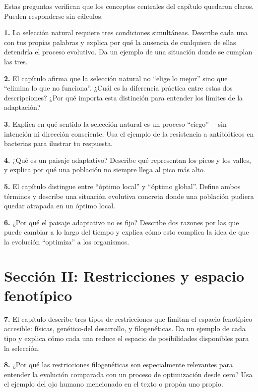 \documentclass[
  letterpaper,
  DIV=11,
  numbers=noendperiod]{scrreprt}
\begin{document}
Estas preguntas verifican que los conceptos centrales del capítulo
quedaron claros. Pueden responderse sin cálculos.

\textbf{1.} La selección natural requiere tres condiciones simultáneas.
Describe cada una con tus propias palabras y explica por qué la ausencia
de cualquiera de ellas detendría el proceso evolutivo. Da un ejemplo de
una situación donde se cumplan las tres.

\textbf{2.} El capítulo afirma que la selección natural no ``elige lo
mejor'' sino que ``elimina lo que no funciona''. ¿Cuál es la diferencia
práctica entre estas dos descripciones? ¿Por qué importa esta distinción
para entender los límites de la adaptación?

\textbf{3.} Explica en qué sentido la selección natural es un proceso
``ciego'' ---sin intención ni dirección consciente. Usa el ejemplo de la
resistencia a antibióticos en bacterias para ilustrar tu respuesta.

\textbf{4.} ¿Qué es un paisaje adaptativo? Describe qué representan los
picos y los valles, y explica por qué una población no siempre llega al
pico más alto.

\textbf{5.} El capítulo distingue entre ``óptimo local'' y ``óptimo
global''. Define ambos términos y describe una situación evolutiva
concreta donde una población pudiera quedar atrapada en un óptimo local.

\textbf{6.} ¿Por qué el paisaje adaptativo no es fijo? Describe dos
razones por las que puede cambiar a lo largo del tiempo y explica cómo
esto complica la idea de que la evolución ``optimiza'' a los organismos.

\section{Sección II: Restricciones y espacio
fenotípico}\label{secciuxf3n-ii-restricciones-y-espacio-fenotuxedpico}

\textbf{7.} El capítulo describe tres tipos de restricciones que limitan
el espacio fenotípico accesible: físicas, genético-del desarrollo, y
filogenéticas. Da un ejemplo de cada tipo y explica cómo cada una reduce
el espacio de posibilidades disponibles para la selección.

\textbf{8.} ¿Por qué las restricciones filogenéticas son especialmente
relevantes para entender la evolución comparada con un proceso de
optimización desde cero? Usa el ejemplo del ojo humano mencionado en el
texto o propón uno propio.
\end{document}
